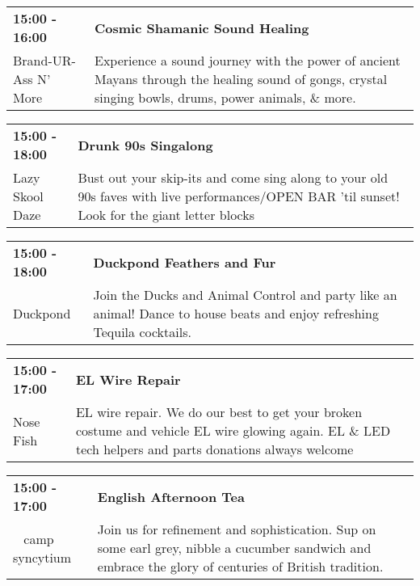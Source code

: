 \begin{tabular}{ p{1in} p{2.2in} }
    \textbf{15:00 - 16:00} & \textbf{Cosmic Shamanic Sound Healing } \\
    Brand-UR-Ass N' More \newline  & Experience a sound journey with the power of ancient Mayans through the healing sound of gongs, crystal singing bowls, drums, power animals, \& more. \\
    \hline 
\end{tabular}
    
\begin{tabular}{ p{1in} p{2.2in} }
    \textbf{15:00 - 18:00} & \textbf{Drunk 90s Singalong} \\
    Lazy Skool Daze \newline  & Bust out your skip-its and come sing along to your old 90s faves with live performances/OPEN BAR 'til sunset! Look for the giant letter blocks \\
    \hline 
\end{tabular}
    
\begin{tabular}{ p{1in} p{2.2in} }
    \textbf{15:00 - 18:00} & \textbf{Duckpond Feathers and Fur} \\
    Duckpond \newline  & Join the Ducks and Animal Control and party like an animal! Dance to house beats and enjoy refreshing Tequila cocktails. \\
    \hline 
\end{tabular}
    
\begin{tabular}{ p{1in} p{2.2in} }
    \textbf{15:00 - 17:00} & \textbf{EL Wire Repair} \\
    Nose Fish \newline  & EL wire repair. We do our best to get your broken costume and vehicle EL wire glowing again. EL \& LED tech helpers and parts donations always welcome \\
    \hline 
\end{tabular}
    
\begin{tabular}{ p{1in} p{2.2in} }
    \textbf{15:00 - 17:00} & \textbf{English Afternoon Tea} \\
    ~ \newline camp syncytium & Join us for refinement and sophistication. Sup on some earl grey, nibble a cucumber sandwich and embrace the glory of centuries of British tradition. \\
    \hline 
\end{tabular}
    
